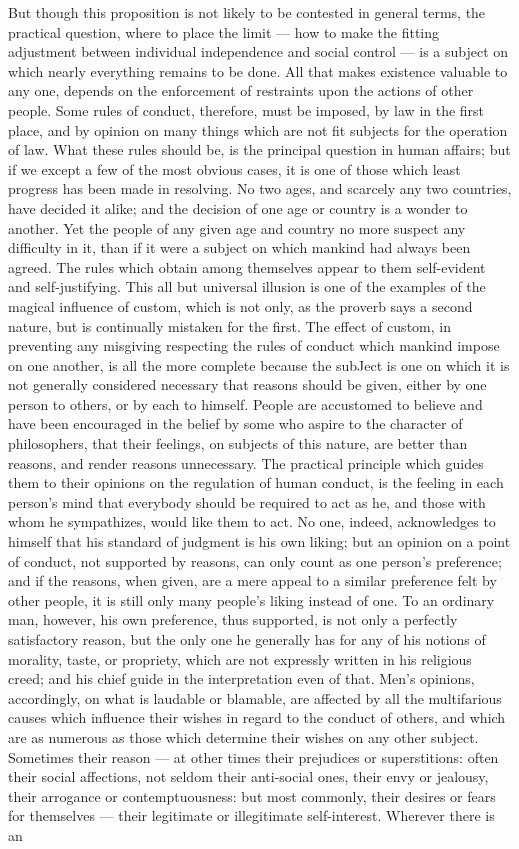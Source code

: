 \documentclass[12pt]{report}
\begin{document}
But though this proposition is not likely to be contested in general terms, the practical question, where to place the limit — how to make the fitting adjustment between individual independence and social control — is a subject on which nearly everything remains to be done. All that makes existence valuable to any one, depends on the enforcement of restraints upon the actions of other people. Some rules of conduct, therefore, must be imposed, by law in the first place, and by opinion on many things which are not fit subjects for the operation of law. What these rules should be, is the principal question in human affairs; but if we except a few of the most obvious cases, it is one of those which least progress has been made in resolving. No two ages, and scarcely any two countries, have decided it alike; and the decision of one age or country is a wonder to another. Yet the people of any given age and country no more suspect any difficulty in it, than if it were a subject on which mankind had always been agreed. The rules which obtain among themselves appear to them self-evident and self-justifying. This all but universal illusion is one of the examples of the magical influence of custom, which is not only, as the proverb says a second nature, but is continually mistaken for the first. The effect of custom, in preventing any misgiving respecting the rules of conduct which mankind impose on one another, is all the more complete because the subJect is one on which it is not generally considered necessary that reasons should be given, either by one person to others, or by each to himself. People are accustomed to believe and have been encouraged in the belief by some who aspire to the character of philosophers, that their feelings, on subjects of this nature, are better than reasons, and render reasons unnecessary. The practical principle which guides them to their opinions on the regulation of human conduct, is the feeling in each person's mind that everybody should be required to act as he, and those with whom he sympathizes, would like them to act. No one, indeed, acknowledges to himself that his standard of judgment is his own liking; but an opinion on a point of conduct, not supported by reasons, can only count as one person's preference; and if the reasons, when given, are a mere appeal to a similar preference felt by other people, it is still only many people's liking instead of one. To an ordinary man, however, his own preference, thus supported, is not only a perfectly satisfactory reason, but the only one he generally has for any of his notions of morality, taste, or propriety, which are not expressly written in his religious creed; and his chief guide in the interpretation even of that. Men's opinions, accordingly, on what is laudable or blamable, are affected by all the multifarious causes which influence their wishes in regard to the conduct of others, and which are as numerous as those which determine their wishes on any other subject. Sometimes their reason — at other times their prejudices or superstitions: often their social affections, not seldom their anti-social ones, their envy or jealousy, their arrogance or contemptuousness: but most commonly, their desires or fears for themselves — their legitimate or illegitimate self-interest. Wherever there is an 
\end{document}
